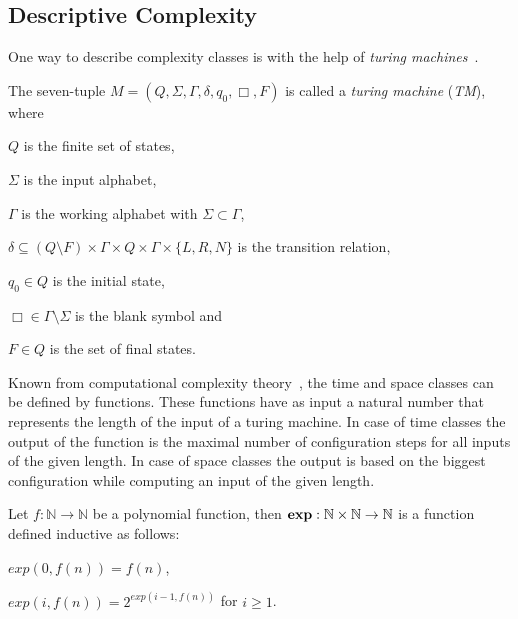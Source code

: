 
\subsection{Descriptive Complexity}\label{subsec:descriptiveComplexity}

One way to describe complexity classes is with the help of \textit{turing machines}~\cite{hopcroft1994einfuehrung}.

\begin{definition}
    The seven-tuple $M = (Q, \Sigma, \Gamma, \delta, q_0, \Box, F)$ is called a \emph{turing machine} (\emph{TM}),
    where
    \begin{compactitem}
        \item $Q$ is the finite set of states,
        \item $\Sigma$ is the input alphabet,
        \item $\Gamma$ is the working alphabet with $\Sigma \subset \Gamma$,
        \item $\delta \subseteq (Q \setminus F) \times \Gamma \times Q \times \Gamma \times \{L, R, N\}$ is the
        transition relation,
        \item $q_0 \in Q$ is the initial state,
        \item $\Box \in \Gamma \setminus \Sigma$ is the blank symbol and
        \item $F \in Q$ is the set of final states.
    \end{compactitem}
\end{definition}

Known from computational complexity theory~\cite{papadimitriou1994complexity}, the time and space classes
can be defined by functions. These functions have as input a natural number that represents the length of the input of a
turing machine. In case of time classes the output of the function is the maximal number of configuration steps for
all inputs of the given length. In case of space classes the output is based on the biggest configuration while
computing an input of the given length.

\begin{definition}
    Let $f: \mathbb{N} \rightarrow \mathbb{N}$ be a polynomial function, then $\emph{exp}: \mathbb{N} \times \mathbb{N}
    \rightarrow \mathbb{N}$ is a function defined inductive as follows:
    \begin{compactitem}
        \item $exp(0, f(n)) = f(n)$,
        \item $exp(i, f(n)) = 2^{exp(i - 1, f(n))}$ for $i \geq 1$.
    \end{compactitem}
\end{definition}

